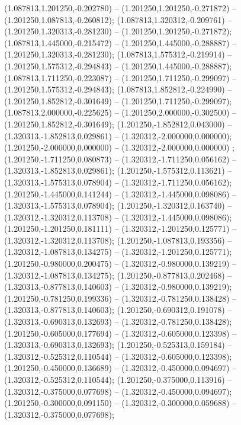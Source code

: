  (1.087813,1.201250,-0.202780) -- (1.201250,1.201250,-0.271872) -- (1.201250,1.087813,-0.260812);
 (1.087813,1.320312,-0.209761) -- (1.201250,1.320313,-0.281230) -- (1.201250,1.201250,-0.271872);
 (1.087813,1.445000,-0.215472) -- (1.201250,1.445000,-0.288887) -- (1.201250,1.320313,-0.281230);
 (1.087813,1.575312,-0.219914) -- (1.201250,1.575312,-0.294843) -- (1.201250,1.445000,-0.288887);
 (1.087813,1.711250,-0.223087) -- (1.201250,1.711250,-0.299097) -- (1.201250,1.575312,-0.294843);
 (1.087813,1.852812,-0.224990) -- (1.201250,1.852812,-0.301649) -- (1.201250,1.711250,-0.299097);
 (1.087813,2.000000,-0.225625) -- (1.201250,2.000000,-0.302500) -- (1.201250,1.852812,-0.301649);
 (1.201250,-1.852812,0.043000) -- (1.320313,-1.852813,0.029861) -- (1.320312,-2.000000,0.000000);
 (1.201250,-2.000000,0.000000) -- (1.320312,-2.000000,0.000000) ;
 (1.201250,-1.711250,0.080873) -- (1.320312,-1.711250,0.056162) -- (1.320313,-1.852813,0.029861);
 (1.201250,-1.575312,0.113621) -- (1.320313,-1.575313,0.078904) -- (1.320312,-1.711250,0.056162);
 (1.201250,-1.445000,0.141244) -- (1.320312,-1.445000,0.098086) -- (1.320313,-1.575313,0.078904);
 (1.201250,-1.320312,0.163740) -- (1.320312,-1.320312,0.113708) -- (1.320312,-1.445000,0.098086);
 (1.201250,-1.201250,0.181111) -- (1.320312,-1.201250,0.125771) -- (1.320312,-1.320312,0.113708);
 (1.201250,-1.087813,0.193356) -- (1.320312,-1.087813,0.134275) -- (1.320312,-1.201250,0.125771);
 (1.201250,-0.980000,0.200475) -- (1.320312,-0.980000,0.139219) -- (1.320312,-1.087813,0.134275);
 (1.201250,-0.877813,0.202468) -- (1.320313,-0.877813,0.140603) -- (1.320312,-0.980000,0.139219);
 (1.201250,-0.781250,0.199336) -- (1.320312,-0.781250,0.138428) -- (1.320313,-0.877813,0.140603);
 (1.201250,-0.690312,0.191078) -- (1.320313,-0.690313,0.132693) -- (1.320312,-0.781250,0.138428);
 (1.201250,-0.605000,0.177694) -- (1.320312,-0.605000,0.123398) -- (1.320313,-0.690313,0.132693);
 (1.201250,-0.525313,0.159184) -- (1.320312,-0.525312,0.110544) -- (1.320312,-0.605000,0.123398);
 (1.201250,-0.450000,0.136689) -- (1.320312,-0.450000,0.094697) -- (1.320312,-0.525312,0.110544);
 (1.201250,-0.375000,0.113916) -- (1.320312,-0.375000,0.077698) -- (1.320312,-0.450000,0.094697);
 (1.201250,-0.300000,0.091150) -- (1.320312,-0.300000,0.059688) -- (1.320312,-0.375000,0.077698);
